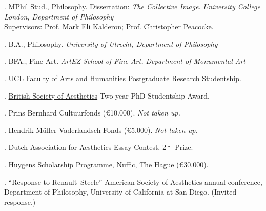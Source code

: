 \documentclass[11pt]{article}
\begin{document}

. MPhil Stud., Philosophy. Dissertation: \href{http://discovery.ucl.ac.uk/1348204/}{\emph{The Collective Image}}. \emph{University College London, Department of  Philosophy \vspace{0.01in}}\\ Supervisors: Prof. Mark Eli Kalderon; Prof. Christopher Peacocke. \vspace{-0.1in}

\bigskip



. B.A., Philosophy. \emph{University of Utrecht, Department of  Philosophy\vspace{0.02in}}

\medskip

. BFA., Fine Art. \emph{ArtEZ School of Fine Art, Department of Monumental Art\vspace{0.02in}}

\bigskip

\medskip

. \href{http://www.ucl.ac.uk/ah/figs/homepage}{UCL Faculty of Arts and Humanities} Postgraduate Research Studentship. %

. \href{http://www.british-aesthetics.org}{British Society of Aesthetics} Two-year PhD Studentship Award. %

. Prins Bernhard Cultuurfonds (€10.000). \emph{Not taken up.}

. Hendrik Müller Vaderlandsch Fonds (€5.000). \emph{Not taken up.} 

. Dutch Association for Aesthetics Essay Contest, 2$^{\textrm{\tiny{nd}}}$ Prize.

. Huygens Scholarship Programme, Nuffic, The Hague (€30.000).

\bigskip 



\medskip

. ``Response to Renault--Steele'' American Society of Aesthetics annual conference, Department of Philosophy, University of California at San Diego. (Invited response.)
\end{document}
